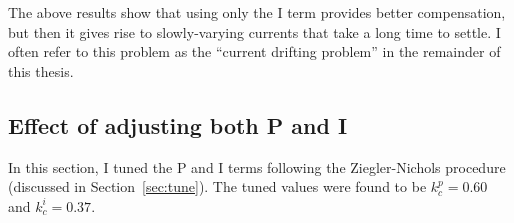%

The above results show that using only the I term provides better
compensation, but then it gives rise to slowly-varying currents that
take a long time to settle.  I often refer to this problem as the
``current drifting problem'' in the remainder of this thesis.

 

\subsection{Effect of adjusting both P and I}

In this section, I tuned the P and I terms following the
Ziegler-Nichols procedure (discussed in Section~\ref{sec:tune}). The
tuned values were found to be $k_c^p=0.60$ and $k_c^i=0.37$.




